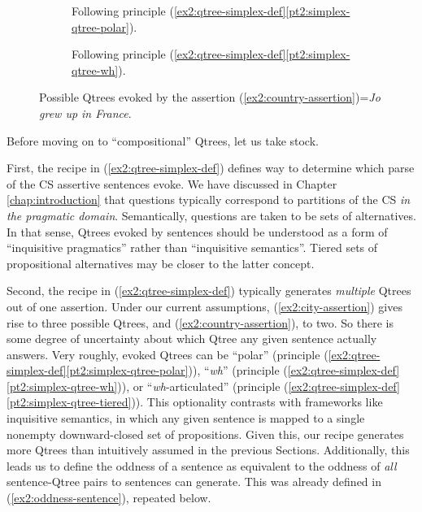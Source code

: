 \begin{figure}[H]
	\centering
	\begin{subfigure}[t]{.45\linewidth}
		\centering
		\caption{Following principle (\ref{ex2:qtree-simplex-def}\ref{pt2:simplex-qtree-polar}).}\label{fig2:country-qtree-polar}
	\end{subfigure}
	\hfill
	\begin{subfigure}[t]{.45\linewidth}
		\centering		{}
		\caption{Following principle (\ref{ex2:qtree-simplex-def}\ref{pt2:simplex-qtree-wh}).}\label{fig2:country-qtree-wh}
	\end{subfigure}
	\caption{Possible Qtrees evoked by the assertion (\ref{ex2:country-assertion})=\textit{Jo grew up in France}.}
\end{figure}


Before moving on to ``compositional'' Qtrees, let us take stock.

First, the recipe in (\ref{ex2:qtree-simplex-def}) defines way to determine which parse of the CS assertive sentences evoke. We have discussed in Chapter \ref{chap:introduction} that questions typically correspond to partitions of the CS \textit{in the pragmatic domain}. Semantically, questions are taken to be sets of alternatives. In that sense, Qtrees evoked by sentences should be understood as a form of ``inquisitive pragmatics'' rather than ``inquisitive semantics''. Tiered sets of propositional alternatives may be closer to the latter concept.

Second, the recipe in (\ref{ex2:qtree-simplex-def}) typically generates \textit{multiple} Qtrees out of one assertion. Under our current assumptions,  (\ref{ex2:city-assertion}) gives rise to three possible Qtrees, and (\ref{ex2:country-assertion}), to two. So there is some degree of uncertainty about which Qtree any given sentence actually answers. Very roughly, evoked Qtrees can be ``polar'' (principle (\ref{ex2:qtree-simplex-def}\ref{pt2:simplex-qtree-polar})), ``\textit{wh}'' (principle (\ref{ex2:qtree-simplex-def}\ref{pt2:simplex-qtree-wh})), or ``\textit{wh}-articulated'' (principle (\ref{ex2:qtree-simplex-def}\ref{pt2:simplex-qtree-tiered})). This optionality contrasts with frameworks like inquisitive semantics, in which any given sentence is mapped to a single nonempty downward-closed set of propositions. Given this, our recipe generates more Qtrees than intuitively assumed in the previous Sections.  Additionally, this leads us to define the oddness of a sentence as equivalent to the oddness of \textit{all} sentence-Qtree pairs to sentences can generate. This was already defined in (\ref{ex2:oddness-sentence}), repeated below.

